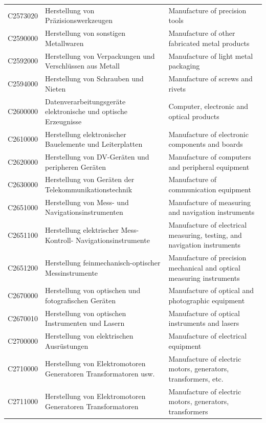 \begin{longtable}{|p{3cm}|p{6cm}|p{6cm}|}
 C2573020   & Herstellung von Präzisionswerkzeugen   & Manufacture of precision tools    \\
 C2590000   & Herstellung von sonstigen Metallwaren   & Manufacture of other fabricated metal products    \\
 C2592000   & Herstellung von Verpackungen und Verschlüssen aus Metall   & Manufacture of light metal packaging    \\
 C2594000   & Herstellung von Schrauben und Nieten   & Manufacture of screws and rivets    \\
 C2600000   & Datenverarbeitungsgeräte elektronische und optische Erzeugnisse   & Computer, electronic and optical products    \\
 C2610000   & Herstellung elektronischer Bauelemente und Leiterplatten   & Manufacture of electronic components and boards    \\
 C2620000   & Herstellung von DV-Geräten und peripheren Geräten   & Manufacture of computers and peripheral equipment    \\
 C2630000   & Herstellung von Geräten der Telekommunikationstechnik   & Manufacture of communication equipment    \\
 C2651000   & Herstellung von Mess- und Navigationsinstrumenten   & Manufacture of measuring and navigation instruments    \\
 C2651100   & Herstellung elektrischer Mess- Kontroll- Navigationsinstrumente   & Manufacture of electrical measuring, testing, and navigation instruments    \\
 C2651200   & Herstellung feinmechanisch-optischer Messinstrumente   & Manufacture of precision mechanical and optical measuring instruments    \\
 C2670000   & Herstellung von optischen und fotografischen Geräten   & Manufacture of optical and photographic equipment    \\
 C2670010   & Herstellung von optischen Instrumenten und Lasern   & Manufacture of optical instruments and lasers    \\
 C2700000   & Herstellung von elektrischen Ausrüstungen   & Manufacture of electrical equipment    \\
 C2710000   & Herstellung von Elektromotoren Generatoren Transformatoren usw.   & Manufacture of electric motors, generators, transformers, etc.    \\
 C2711000   & Herstellung von Elektromotoren Generatoren Transformatoren   & Manufacture of electric motors, generators, transformers    \\

\end{longtable}
